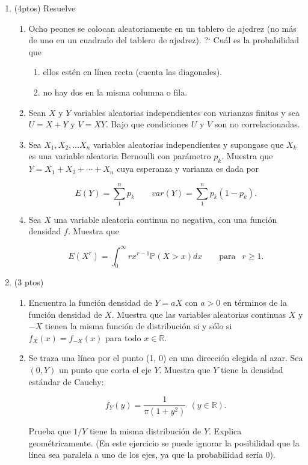 \documentclass[a4paper,11pt]{report}
\newcommand{\PR}{\mathbb{P}}
\begin{document}
\begin{enumerate}
\item (4ptos) Resuelve
\begin{enumerate}
	\item  Ocho peones se colocan aleatoriamente en un tablero de ajedrez (no m\'as de uno en un cuadrado del tablero de ajedrez). ?` Cu\'al es la probabilidad que
	\begin{enumerate}
		\item ellos est\'en en  l\'inea recta (cuenta  las diagonales).
		\item no hay dos en la misma columna o fila.
	\end{enumerate}
	\item Sean $X$ y $Y$ variables aleatorias independientes con varianzas finitas y sea $U = X + Y$ y $V = XY$. Bajo que condiciones $U$ y $V$ son no correlacionadas.
	
	\item Sea $X_1, X_2, \dots X_n$ variables aleatorias independientes y supongase que $X_k$ es una variable aleatoria Bernoulli con par\'ametro $p_k$. Muestra que $Y = X_1  +X_2 + \cdots + X_n$ cuya esperanza y varianza es dada por
	
	\[
	E(Y) = \sum_{1}^{n}p_k \qquad var(Y) = \sum_{1}^{n}p_k(1 - p_k).
	\]
	\item Sea $X$ una variable aleatoria continua no negativa, con una funci\'on densidad $f$. Muestra que
	
	\[
	E(X^r) = \int_{0}^{\infty}rx^{r-1}\PR(X > x)dx \qquad \mbox{para } \ \ r\geq 1.
	\]
\end{enumerate}

\item (3 ptos) 

\begin{enumerate}
\item Encuentra la funci\'on densidad de $Y = aX$ con $a > 0$ en t\'erminos de la funci\'on densidad de $X$. Muestra que las variables aleatorias continuas $X$ y $-X$ tienen la misma funci\'on de distribuci\'on si y s\'olo si $f_{X}(x) = f_{-X}(x)$ para todo $x \in \mathbb{R}$.
\item Se traza una l\'inea por el punto (1, 0) en una direcci\'on elegida al azar. Sea $(0,Y)$ un punto  que corta el eje $Y$. Muestra que $Y$  tiene la densidad est\'andar de Cauchy:

\[
f_{Y}(y) = \dfrac{1}{\pi(1 + y^2)} \ \ (y \in \mathbb{R}).
\]

Prueba que $1/Y$ tiene la misma distribuci\'on  de $Y$. Explica geom\'etricamente. (En este ejercicio se puede ignorar la posibilidad que la l\'inea sea paralela a uno de los ejes, ya que la probabilidad ser\'ia $0$).



\end{enumerate}
\end{enumerate}
\end{document}
